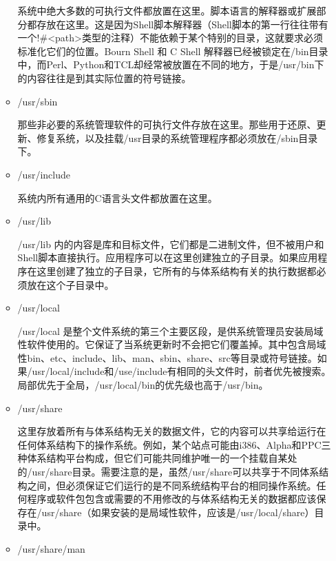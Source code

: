 \begin{itemize}
\begin{itemize}
	\qquad 系统中绝大多数的可执行文件都放置在这里。脚本语言的解释器或扩展部分都存放在这里。这是因为Shell脚本解释器（Shell脚本的第一行往往带有一个!\#<path>类型的注释）不能依赖于某个特别的目录，这就要求必须标准化它们的位置。Bourn Shell 和 C Shell 解释器已经被锁定在/bin目录中，而Perl、Python和TCL却经常被放置在不同的地方，于是/usr/bin下的内容往往是到其实际位置的符号链接。
	
	\item /usr/sbin
	
	\qquad 那些非必要的系统管理软件的可执行文件存放在这里。那些用于还原、更新、修复系统，以及挂载/usr目录的系统管理程序都必须放在/sbin目录下。
	
	\item /usr/include
	
	\qquad 系统内所有通用的C语言头文件都放置在这里。
	
	\item /usr/lib
	
	\qquad /usr/lib 内的内容是库和目标文件，它们都是二进制文件，但不被用户和Shell脚本直接执行。应用程序可以在这里创建独立的子目录。如果应用程序在这里创建了独立的子目录，它所有的与体系结构有关的执行数据都必须放在这个子目录中。
	
	\item /usr/local
	
	\qquad /usr/local 是整个文件系统的第三个主要区段，是供系统管理员安装局域性软件使用的。它保证了当系统更新时不会把它们覆盖掉。其中包含局域性bin、etc、include、lib、man、sbin、share、src等目录或符号链接。如果/usr/local/include和/use/include有相同的头文件时，前者优先被搜索。局部优先于全局，/usr/local/bin的优先级也高于/usr/bin。
	
	\item /usr/share
	
	\qquad 这里存放着所有与体系结构无关的数据文件，它的内容可以共享给运行在任何体系结构下的操作系统。例如，某个站点可能由i386、Alpha和PPC三种体系结构平台构成，但它们可能共同维护唯一的一个挂载自某处的/usr/share目录。需要注意的是，虽然/usr/share可以共享于不同体系结构之间，但必须保证它们运行的是不同系统结构平台的相同操作系统。任何程序或软件包包含或需要的不用修改的与体系结构无关的数据都应该保存在/usr/share（如果安装的是局域性软件，应该是/usr/local/share）目录中。
	
	\item /usr/share/man
	

\end{itemize}
\end{itemize}
